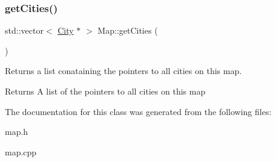 \subsubsection{\texorpdfstring{get\+Cities()}{getCities()}}
{\footnotesize\ttfamily std\+::vector$<$ \hyperlink{class_city}{City} $\ast$ $>$ Map\+::get\+Cities (\begin{DoxyParamCaption}{ }\end{DoxyParamCaption})}



Returns a list conataining the pointers to all cities on this map. 

\begin{DoxyReturn}{Returns}
A list of the pointers to all cities on this map 
\end{DoxyReturn}


The documentation for this class was generated from the following files\+:\begin{DoxyCompactItemize}
\item 
map.\+h\item 
map.\+cpp\end{DoxyCompactItemize}
